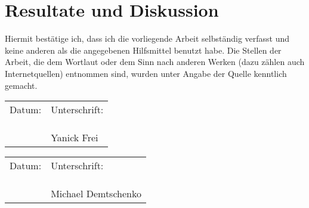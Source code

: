 \section{Resultate und Diskussion}

\vfill{
Hiermit bestätige ich, dass ich die vorliegende Arbeit selbständig verfasst und keine
anderen als die angegebenen Hilfsmittel benutzt habe. Die Stellen der Arbeit, die dem
Wortlaut oder dem Sinn nach anderen Werken (dazu zählen auch Internetquellen)
entnommen sind, wurden unter Angabe der Quelle kenntlich gemacht. 

\begin{tabular}{p{8cm}p{6cm}}
	Datum: & Unterschrift: \\ \\ \\
	\underline{\hspace{6cm}} & \underline{\hspace{6cm}} \\
	& Yanick Frei
\end{tabular}

\begin{tabular}{p{8cm}p{6cm}}
	Datum: & Unterschrift: \\ \\ \\
	\underline{\hspace{6cm}} & \underline{\hspace{6cm}} \\
	& Michael Demtschenko
\end{tabular}}

